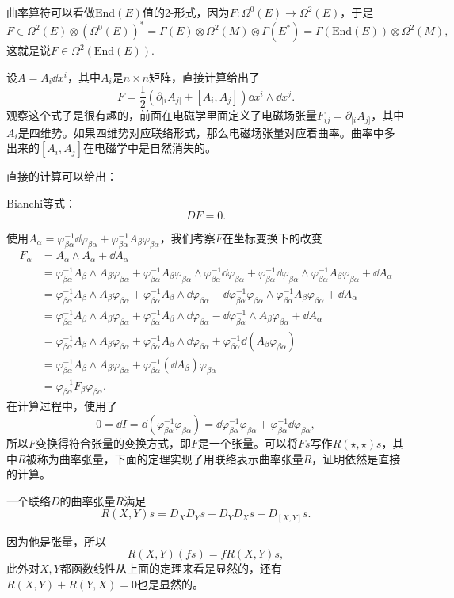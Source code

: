 曲率算符可以看做$\mathrm{End}(E)$值的2-形式，因为$F:\Omega^0(E)\to \Omega^2(E)$，于是
\[
	F\in \Omega^2(E)\otimes (\Omega^0(E))^*=\Gamma(E)\otimes \Omega^2(M)\otimes \Gamma(E^*)=\Gamma(\mathrm{End}(E))\otimes \Omega^2(M),
\]
这就是说$F\in \Omega^2(\mathrm{End}(E))$.

设$A=A_i\dd x^i$，其中$A_i$是$n\times n$矩阵，直接计算给出了
\[
	F=\frac{1}{2}\left(\partial_{[i}A_{j]}+[A_i,A_j]\right)\dd x^i\wedge \dd x^j.
\]
观察这个式子是很有趣的，前面在电磁学里面定义了电磁场张量$F_{ij}=\partial_{[i}A_{j]}$，其中$A_i$是四维势。如果四维势对应联络形式，那么电磁场张量对应着曲率。曲率中多出来的$[A_i,A_j]$在电磁学中是自然消失的。

直接的计算可以给出：
\begin{theo}Bianchi等式：
\[
	DF=0.
\]
\end{theo}

使用$A_\alpha=\varphi_{\beta\alpha}^{-1}\dd\varphi_{\beta\alpha}+\varphi_{\beta\alpha}^{-1}A_\beta \varphi_{\beta\alpha}$，我们考察$F$在坐标变换下的改变
\begin{align*}
	F_\alpha&=A_\alpha\wedge A_\alpha+\dd A_\alpha\\
	&=\varphi_{\beta\alpha}^{-1}A_\beta \wedge A_\beta \varphi_{\beta\alpha}+ \varphi_{\beta\alpha}^{-1}A_\beta \varphi_{\beta\alpha}\wedge \varphi_{\beta\alpha}^{-1}\dd\varphi_{\beta\alpha}+\varphi_{\beta\alpha}^{-1}\dd\varphi_{\beta\alpha}\wedge \varphi_{\beta\alpha}^{-1}A_\beta \varphi_{\beta\alpha}+\dd A_\alpha\\
	&=\varphi_{\beta\alpha}^{-1}A_\beta \wedge A_\beta \varphi_{\beta\alpha}+ \varphi_{\beta\alpha}^{-1}A_\beta \wedge \dd\varphi_{\beta\alpha}-\dd\varphi_{\beta\alpha}^{-1}\varphi_{\beta\alpha}\wedge \varphi_{\beta\alpha}^{-1}A_\beta \varphi_{\beta\alpha}+\dd A_\alpha\\
	&=\varphi_{\beta\alpha}^{-1}A_\beta \wedge A_\beta \varphi_{\beta\alpha}+ \varphi_{\beta\alpha}^{-1}A_\beta \wedge \dd\varphi_{\beta\alpha}-\dd\varphi_{\beta\alpha}^{-1}\wedge A_\beta \varphi_{\beta\alpha}+\dd A_\alpha\\
	&=\varphi_{\beta\alpha}^{-1}A_\beta \wedge A_\beta \varphi_{\beta\alpha}+ \varphi_{\beta\alpha}^{-1}A_\beta \wedge \dd\varphi_{\beta\alpha}+\varphi_{\beta\alpha}^{-1}\dd \left(A_\beta \varphi_{\beta\alpha}\right)\\
	&=\varphi_{\beta\alpha}^{-1}A_\beta \wedge A_\beta \varphi_{\beta\alpha}+\varphi_{\beta\alpha}^{-1}(\dd A_\beta)\varphi_{\beta\alpha}\\
	&=\varphi_{\beta\alpha}^{-1}F_\beta \varphi_{\beta\alpha}.
\end{align*}
在计算过程中，使用了
\[
	0=\dd I=\dd (\varphi_{\beta\alpha}^{-1}\varphi_{\beta\alpha})=\dd \varphi_{\beta\alpha}^{-1}\varphi_{\beta\alpha}+\varphi_{\beta\alpha}^{-1}\dd\varphi_{\beta\alpha},
\]
所以$F$变换得符合张量的变换方式，即$F$是一个张量。可以将$Fs$写作$R(\star,\star)s$，其中$R$被称为曲率张量，下面的定理实现了用联络表示曲率张量$R$，证明依然是直接的计算。
\begin{theo}一个联络$D$的曲率张量$R$满足
	\[
		R(X,Y)s=D_XD_Ys-D_YD_Xs-D_{[X,Y]}s.
	\]
\end{theo}
因为他是张量，所以
\[
	R(X,Y)(fs)=fR(X,Y)s,
\]
此外对$X,Y$都函数线性从上面的定理来看是显然的，还有$R(X,Y)+R(Y,X)=0$也是显然的。

